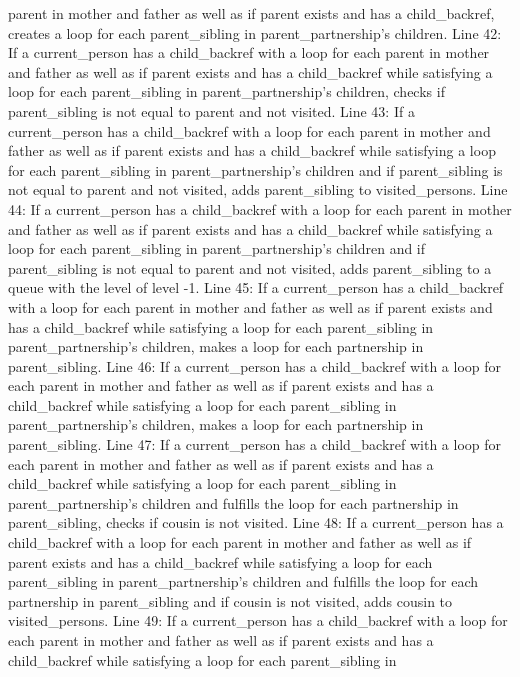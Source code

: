 \documentclass[
]{article}
\begin{document}
parent in mother and father as well as if parent exists and has a
child\_backref, creates a loop for each parent\_sibling in
parent\_partnership's children. Line 42: If a current\_person has a child\_backref with a loop for each
parent in mother and father as well as if parent exists and has a
child\_backref while satisfying a loop for each parent\_sibling in
parent\_partnership's children, checks if parent\_sibling is not equal
to parent and not visited. Line 43: If a current\_person has a child\_backref with a loop for each
parent in mother and father as well as if parent exists and has a
child\_backref while satisfying a loop for each parent\_sibling in
parent\_partnership's children and if parent\_sibling is not equal to
parent and not visited, adds parent\_sibling to visited\_persons. Line 44: If a current\_person has a child\_backref with a loop for each
parent in mother and father as well as if parent exists and has a
child\_backref while satisfying a loop for each parent\_sibling in
parent\_partnership's children and if parent\_sibling is not equal to
parent and not visited, adds parent\_sibling to a queue with the level
of level -1. Line 45: If a current\_person has a child\_backref with a loop for each
parent in mother and father as well as if parent exists and has a
child\_backref while satisfying a loop for each parent\_sibling in
parent\_partnership's children, makes a loop for each partnership in
parent\_sibling. Line 46: If a current\_person has a child\_backref with a loop for each
parent in mother and father as well as if parent exists and has a
child\_backref while satisfying a loop for each parent\_sibling in
parent\_partnership's children, makes a loop for each partnership in
parent\_sibling. Line 47: If a current\_person has a child\_backref with a loop for each
parent in mother and father as well as if parent exists and has a
child\_backref while satisfying a loop for each parent\_sibling in
parent\_partnership's children and fulfills the loop for each
partnership in parent\_sibling, checks if cousin is not visited. Line 48: If a current\_person has a child\_backref with a loop for each
parent in mother and father as well as if parent exists and has a
child\_backref while satisfying a loop for each parent\_sibling in
parent\_partnership's children and fulfills the loop for each
partnership in parent\_sibling and if cousin is not visited, adds cousin
to visited\_persons. Line 49: If a current\_person has a child\_backref with a loop for each
parent in mother and father as well as if parent exists and has a
child\_backref while satisfying a loop for each parent\_sibling in
\end{document}
